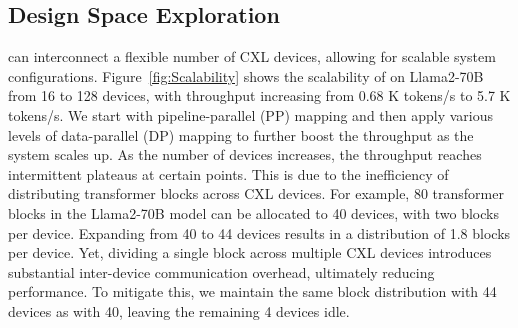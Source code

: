 





\subsection{Design Space Exploration}


\att{} can interconnect a flexible number of CXL devices, allowing for scalable system configurations. Figure~\ref{fig:Scalability} shows the scalability of \att{} on Llama2-70B from 16 to 128 devices, with throughput increasing from 0.68 K tokens/s to 5.7 K tokens/s. We start with pipeline-parallel (PP) mapping and then apply various levels of data-parallel (DP) mapping to further boost the throughput as the \att{} system scales up. 
As the number of devices increases, the throughput reaches intermittent plateaus at certain points. This is due to the inefficiency of distributing transformer blocks across CXL devices. For example, 80 transformer blocks in the Llama2-70B model can be allocated to 40 devices, with two blocks per device. Expanding from 40 to 44 devices results in a distribution of 1.8 blocks per device. Yet, dividing a single block across multiple CXL devices introduces substantial inter-device communication overhead, ultimately reducing performance. To mitigate this, we maintain the same block distribution with 44 devices as with 40, leaving the remaining 4 devices idle. 

